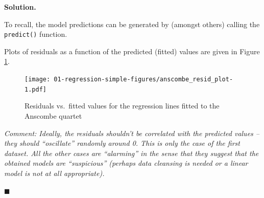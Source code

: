 \documentclass[10pt,b5paper,krantz1]{krantz}
\newenvironment{Shaded}{\begin{snugshade}}{\end{snugshade}}
\newcommand{\CommentTok}[1]{\textcolor[rgb]{0.37,0.37,0.37}{\textit{#1}}}
\newcommand{\DataTypeTok}[1]{\textcolor[rgb]{0.27,0.27,0.27}{#1}}
\newcommand{\DecValTok}[1]{\textcolor[rgb]{0.06,0.06,0.06}{#1}}
\newcommand{\KeywordTok}[1]{\textcolor[rgb]{0.27,0.27,0.27}{\textbf{#1}}}
\newcommand{\NormalTok}[1]{#1}
\newcommand{\OperatorTok}[1]{\textcolor[rgb]{0.43,0.43,0.43}{\textbf{#1}}}
\newcommand{\StringTok}[1]{\textcolor[rgb]{0.5,0.5,0.5}{#1}}
\newenvironment{solution}{%
\bigskip\noindent\textbf{Solution. }%
\it\ignorespaces%
\ignorespaces%
}{\ignorespaces%
\hfill$\blacksquare$%
}
\begin{document}
\begin{solution}

To recall, the model predictions can be generated by (amongst others)
calling the \texttt{predict()} function.

\begin{Shaded}
\end{Shaded}

Plots of residuals as a function of the predicted (fitted) values
are given in Figure \ref{fig:anscombe_resid_plot}.

\begin{Shaded}
\end{Shaded}

\begin{figure}
\hypertarget{fig:anscombe_resid_plot}{%
\centering
\texttt{[image: 01-regression-simple-figures/anscombe\_resid\_plot-1.pdf]}
\caption{Residuals vs.~fitted values for the regression lines fitted to the Anscombe quartet}\label{fig:anscombe_resid_plot}
}
\end{figure}

\emph{Comment: Ideally, the residuals shouldn't be correlated
with the predicted values -- they should ``oscillate'' randomly
around 0. This is only the case of the first dataset.
All the other cases are ``alarming'' in the sense that
they suggest that the obtained models are ``suspicious''
(perhaps data cleansing is needed or a linear model is not at all appropriate).}

\end{solution}
\end{document}
